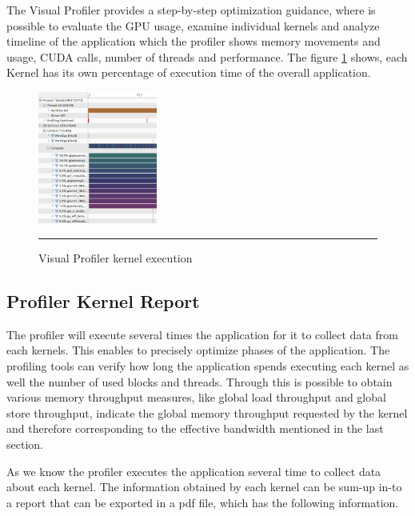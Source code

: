The Visual Profiler provides a step-by-step optimization guidance, where is possible to evaluate the GPU usage, examine individual kernels and analyze timeline of the application which the profiler shows memory movements and usage, CUDA calls, number of threads and performance. The figure \ref{fig:visual01} shows, each Kernel has its own percentage of execution time of the overall application.\cite{practices}

\begin{figure}[htbp]
	\centering
		\includegraphics[width=0.35\textwidth]{Figures/visual01.png}
		\rule{35em}{0.5pt}
	\caption[Visual Profiler example]{Visual Profiler kernel execution}
	\label{fig:visual01}
\end{figure}

\subsection{Profiler Kernel Report}

The profiler will execute several times the application for it to collect data from each kernels. This enables to precisely optimize phases of the application\cite{example}. The profiling tools can verify how long the application spends executing each kernel as well the number of used blocks and threads. Through this is possible to obtain various memory throughput measures, like global load throughput and global store throughput, indicate the global memory throughput requested by the kernel and therefore corresponding to the effective bandwidth mentioned in the last section.

As we know the profiler executes the application several time to collect data about each kernel. The information obtained by each kernel can be sum-up in-to a report that can be exported in a pdf file, which has the following information.

